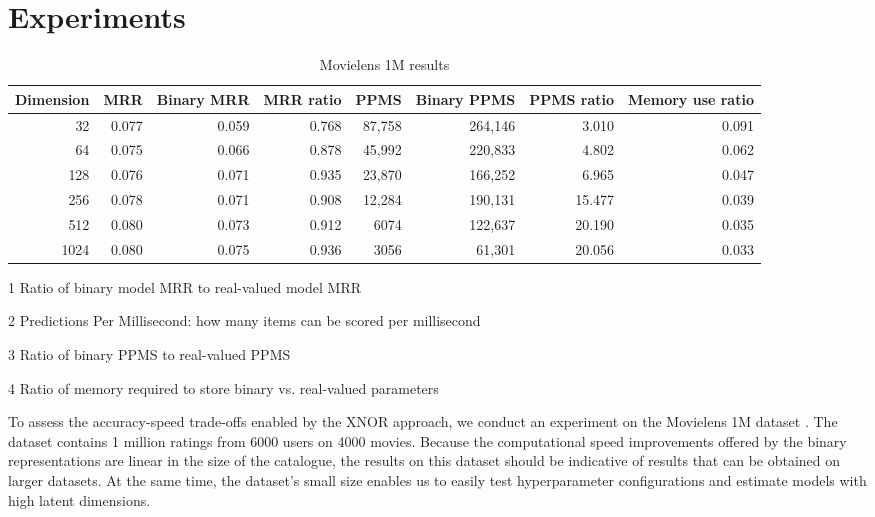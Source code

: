 \documentclass[sigchi]{acmart}
\begin{document}
\section{Experiments}
\begin{table*}[htbp]
\begin{threeparttable}
\caption{Movielens 1M results}
\label{tb:results}
\centering
\begin{tabular}{rrrrrrrr}
\toprule
Dimension &   MRR & Binary MRR & MRR ratio\tnote{1} &   PPMS\tnote{2} & Binary PPMS & PPMS ratio\tnote{3} & Memory use ratio\tnote{4} \\
\midrule
       32 & 0.077 &      0.059 &     0.768 & 87,758 &     264,146 &      3.010 &            0.091 \\
       64 & 0.075 &      0.066 &     0.878 & 45,992 &     220,833 &      4.802 &            0.062 \\
      128 & 0.076 &      0.071 &     0.935 & 23,870 &     166,252 &      6.965 &            0.047 \\
      256 & 0.078 &      0.071 &     0.908 & 12,284 &     190,131 &     15.477 &            0.039 \\
      512 & 0.080 &      0.073 &     0.912 &   6074 &     122,637 &     20.190 &            0.035 \\
     1024 & 0.080 &      0.075 &     0.936 &   3056 &      61,301 &     20.056 &            0.033 \\
\bottomrule
\end{tabular}
\begin{tablenotes}
\small{
\item[1] Ratio of binary model MRR to real-valued model MRR
\item[2] Predictions Per Millisecond: how many items can be scored per millisecond
\item[3] Ratio of binary PPMS to real-valued PPMS
\item[4] Ratio of memory required to store binary vs. real-valued parameters
}
\end{tablenotes}
\end{threeparttable}
\end{table*}
To assess the accuracy-speed trade-offs enabled by the XNOR approach, we conduct an experiment on the Movielens 1M dataset \citep{harper2016movielens}. The dataset contains 1 million ratings from 6000 users on 4000 movies. Because the computational speed improvements offered by the binary representations are linear in the size of the catalogue, the results on this dataset should be indicative of results that can be obtained on larger datasets. At the same time, the dataset's small size enables us to easily test hyperparameter configurations and estimate models with high latent dimensions.
\end{document}
